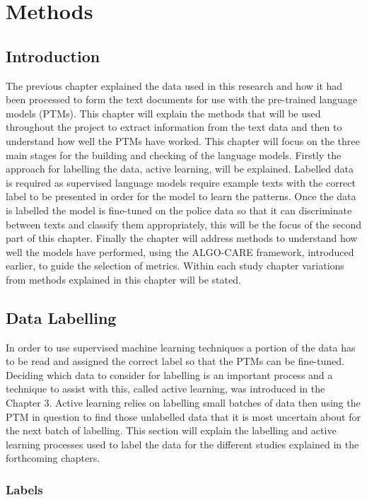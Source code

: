 \chapter{Methods}

\section{Introduction}
The previous chapter explained the data used in this research and how it had been processed to form the text documents for use with the pre-trained language models (PTMs). This chapter will explain the methods that will be used throughout the project to extract information from the text data and then to understand how well the PTMs have worked. This chapter will focus on the three main stages for the building and checking of the language models.  Firstly the approach for labelling the data, active learning, will be explained. Labelled data is required as supervised language models require example texts with the correct label to be presented  in order for the model to learn the patterns. Once the data is labelled the model is fine-tuned on the police data so that it can discriminate between texts and classify them appropriately, this will be the focus of the second part of this chapter. Finally the chapter will address methods to understand how well the models have performed, using the ALGO-CARE framework, introduced earlier, to guide the selection of metrics. Within each study chapter variations from methods explained in this chapter will be stated. 

\section{Data Labelling} In order to use supervised machine learning techniques a portion of the data has to be read and assigned the correct label so that the PTMs can be fine-tuned. Deciding which data to consider for labelling is an important process and a technique to assist with this,  called active learning, was introduced in the Chapter 3. Active learning relies on labelling small batches of data then using the PTM in question to find those unlabelled data that it is most uncertain about for the next batch of labelling. This section will explain the labelling and active learning processes used to label the data for the different studies explained in the forthcoming chapters.

\subsection{Labels}

